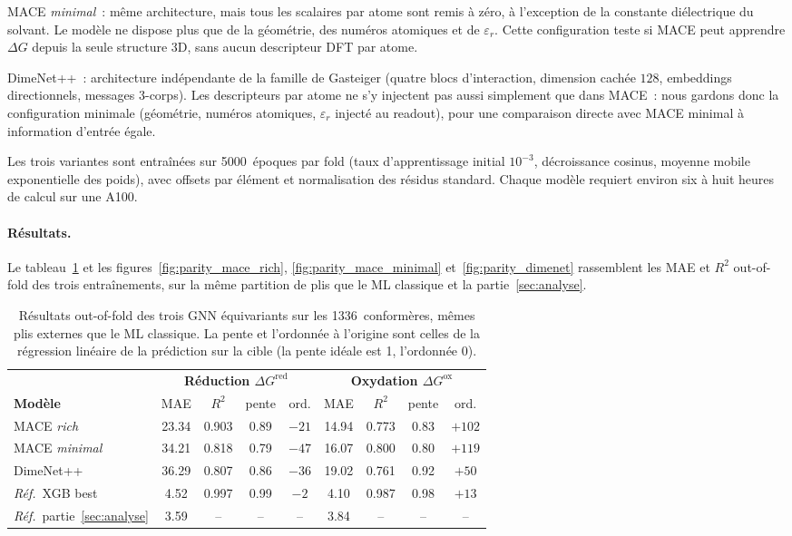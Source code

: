 MACE \emph{minimal}~: même architecture, mais tous les scalaires par atome sont remis à zéro, à l'exception de la constante diélectrique du solvant. Le modèle ne dispose plus que de la géométrie, des numéros atomiques et de $\varepsilon_r$. Cette configuration teste si MACE peut apprendre $\Delta G$ depuis la seule structure 3D, sans aucun descripteur DFT par atome.

DimeNet++~: architecture indépendante de la famille de Gasteiger (quatre blocs d'interaction, dimension cachée $128$, embeddings directionnels, messages 3-corps). Les descripteurs par atome ne s'y injectent pas aussi simplement que dans MACE~: nous gardons donc la configuration minimale (géométrie, numéros atomiques, $\varepsilon_r$ injecté au readout), pour une comparaison directe avec MACE minimal à information d'entrée égale.

Les trois variantes sont entraînées sur 5000~époques par fold (taux d'apprentissage initial $10^{-3}$, décroissance cosinus, moyenne mobile exponentielle des poids), avec offsets par élément et normalisation des résidus standard. Chaque modèle requiert environ six à huit heures de calcul sur une A100.

\paragraph{Résultats.}
Le tableau~\ref{tab:gnn_results} et les figures~\ref{fig:parity_mace_rich}, \ref{fig:parity_mace_minimal} et~\ref{fig:parity_dimenet} rassemblent les MAE et $R^2$ out-of-fold des trois entraînements, sur la même partition de plis que le ML classique et la partie~\ref{sec:analyse}.

\begin{table}[H]
\centering
\caption{Résultats out-of-fold des trois GNN équivariants sur les 1336~conformères, mêmes plis externes que le ML classique. La pente et l'ordonnée à l'origine sont celles de la régression linéaire de la prédiction sur la cible (la pente idéale est 1, l'ordonnée 0).}
\label{tab:gnn_results}
\footnotesize
\begin{tabular}{l c c c c c c c c}
\toprule
 & \multicolumn{4}{c}{\textbf{Réduction $\Delta G^\text{red}$}} & \multicolumn{4}{c}{\textbf{Oxydation $\Delta G^\text{ox}$}} \\
\cmidrule(lr){2-5}\cmidrule(lr){6-9}
\textbf{Modèle} & MAE & $R^2$ & pente & ord. & MAE & $R^2$ & pente & ord. \\
\midrule
MACE \emph{rich}    & 23.34 & 0.903 & 0.89 & $-21$ & 14.94 & 0.773 & 0.83 & $+102$ \\
MACE \emph{minimal} & 34.21 & 0.818 & 0.79 & $-47$ & 16.07 & 0.800 & 0.80 & $+119$ \\
DimeNet++           & 36.29 & 0.807 & 0.86 & $-36$ & 19.02 & 0.761 & 0.92 & $+50$  \\
\midrule
\emph{Réf.}~XGB best                  & 4.52 & 0.997 & 0.99 & $-2$  & 4.10 & 0.987 & 0.98 & $+13$ \\
\emph{Réf.}~partie~\ref{sec:analyse}  & 3.59 & --    & --   & --    & 3.84 & --    & --   & -- \\
\bottomrule
\end{tabular}
\end{table}

